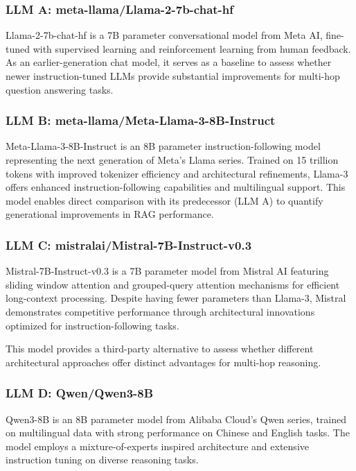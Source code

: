 \documentclass[10pt,twocolumn]{article}
\begin{document}
\subsubsection{LLM A: meta-llama/Llama-2-7b-chat-hf}

Llama-2-7b-chat-hf \cite{touvronLlama2Open2023} is a 7B parameter conversational model from Meta AI, fine-tuned with supervised learning and reinforcement learning from human feedback. As an earlier-generation chat model, it serves as a baseline to assess whether newer instruction-tuned LLMs provide substantial improvements for multi-hop question answering tasks.

\subsubsection{LLM B: meta-llama/Meta-Llama-3-8B-Instruct}

Meta-Llama-3-8B-Instruct is an 8B parameter instruction-following model representing the next generation of Meta's Llama series. Trained on 15 trillion tokens with improved tokenizer efficiency and architectural refinements, Llama-3 offers enhanced instruction-following capabilities and multilingual support. This model enables direct comparison with its predecessor (LLM A) to quantify generational improvements in RAG performance.

\subsubsection{LLM C: mistralai/Mistral-7B-Instruct-v0.3}

Mistral-7B-Instruct-v0.3 \cite{jiangMistral7B2023} is a 7B parameter model from Mistral AI featuring sliding window attention and grouped-query attention mechanisms for efficient long-context processing. Despite having fewer parameters than Llama-3, Mistral demonstrates competitive performance through architectural innovations optimized for instruction-following tasks.

This model provides a third-party alternative to assess whether different architectural approaches offer distinct advantages for multi-hop reasoning.

\subsubsection{LLM D: Qwen/Qwen3-8B}

Qwen3-8B \cite{yangQwen3TechnicalReport2025} is an 8B parameter model from Alibaba Cloud's Qwen series, trained on multilingual data with strong performance on Chinese and English tasks. The model employs a mixture-of-experts inspired architecture and extensive instruction tuning on diverse reasoning tasks.
\end{document}
